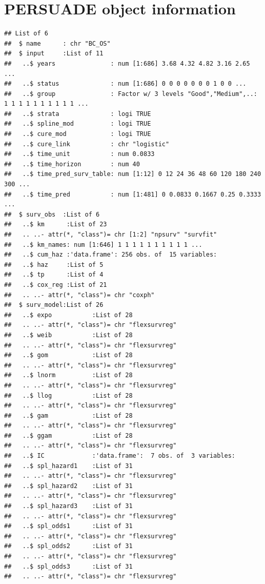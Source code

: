 \documentclass[]{article}
\begin{document}
\newpage

\section{PERSUADE object information}\label{persuade-object-information}

\begin{verbatim}
## List of 6
##  $ name      : chr "BC_OS"
##  $ input     :List of 11
##   ..$ years               : num [1:686] 3.68 4.32 4.82 3.16 2.65 ...
##   ..$ status              : num [1:686] 0 0 0 0 0 0 0 1 0 0 ...
##   ..$ group               : Factor w/ 3 levels "Good","Medium",..: 1 1 1 1 1 1 1 1 1 1 ...
##   ..$ strata              : logi TRUE
##   ..$ spline_mod          : logi TRUE
##   ..$ cure_mod            : logi TRUE
##   ..$ cure_link           : chr "logistic"
##   ..$ time_unit           : num 0.0833
##   ..$ time_horizon        : num 40
##   ..$ time_pred_surv_table: num [1:12] 0 12 24 36 48 60 120 180 240 300 ...
##   ..$ time_pred           : num [1:481] 0 0.0833 0.1667 0.25 0.3333 ...
##  $ surv_obs  :List of 6
##   ..$ km      :List of 23
##   .. ..- attr(*, "class")= chr [1:2] "npsurv" "survfit"
##   ..$ km_names: num [1:646] 1 1 1 1 1 1 1 1 1 1 ...
##   ..$ cum_haz :'data.frame': 256 obs. of  15 variables:
##   ..$ haz     :List of 5
##   ..$ tp      :List of 4
##   ..$ cox_reg :List of 21
##   .. ..- attr(*, "class")= chr "coxph"
##  $ surv_model:List of 26
##   ..$ expo           :List of 28
##   .. ..- attr(*, "class")= chr "flexsurvreg"
##   ..$ weib           :List of 28
##   .. ..- attr(*, "class")= chr "flexsurvreg"
##   ..$ gom            :List of 28
##   .. ..- attr(*, "class")= chr "flexsurvreg"
##   ..$ lnorm          :List of 28
##   .. ..- attr(*, "class")= chr "flexsurvreg"
##   ..$ llog           :List of 28
##   .. ..- attr(*, "class")= chr "flexsurvreg"
##   ..$ gam            :List of 28
##   .. ..- attr(*, "class")= chr "flexsurvreg"
##   ..$ ggam           :List of 28
##   .. ..- attr(*, "class")= chr "flexsurvreg"
##   ..$ IC             :'data.frame':  7 obs. of  3 variables:
##   ..$ spl_hazard1    :List of 31
##   .. ..- attr(*, "class")= chr "flexsurvreg"
##   ..$ spl_hazard2    :List of 31
##   .. ..- attr(*, "class")= chr "flexsurvreg"
##   ..$ spl_hazard3    :List of 31
##   .. ..- attr(*, "class")= chr "flexsurvreg"
##   ..$ spl_odds1      :List of 31
##   .. ..- attr(*, "class")= chr "flexsurvreg"
##   ..$ spl_odds2      :List of 31
##   .. ..- attr(*, "class")= chr "flexsurvreg"
##   ..$ spl_odds3      :List of 31
##   .. ..- attr(*, "class")= chr "flexsurvreg"

\end{verbatim}
\end{document}
